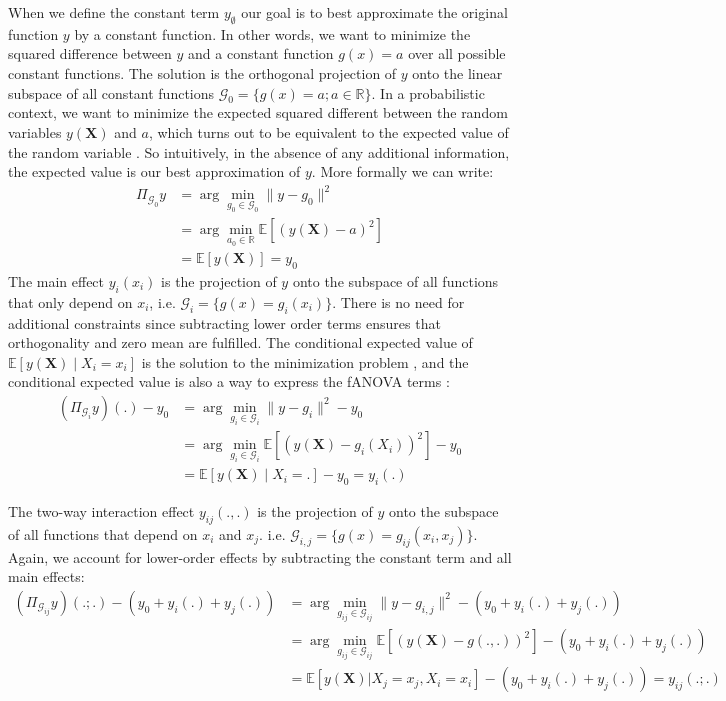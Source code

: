 When we define the constant term $y_\emptyset$ our goal is to best approximate the original function $y$ by a constant function. In other words, we want to minimize the squared difference between $y$ and a constant function $g(x) = a$ over all possible constant functions. The solution is the orthogonal projection of $y$ onto the linear subspace of all constant functions $\mathcal{G}_0 = \{g(x) = a; a \in \mathbb{R}\}$. In a probabilistic context, we want to minimize the expected squared different between the random variables $y(\boldsymbol{X})$ and $a$, which turns out to be equivalent to the expected value of the random variable \citep{Vaart_1998}. So intuitively, in the absence of any additional information, the expected value is our best approximation of $y$. More formally we can write:
\begin{align*}
    \Pi_{\mathcal{G}_0}y
    &= \arg \min_{g_0 \in \mathcal{G}_0} \|y - g_0\|^2 \\ %
    &= \arg \min_{a_0 \in \mathbb{R}} \mathbb{E}[(y(\boldsymbol{X}) - a)^2] \\ %
    &= \mathbb{E}[y(\boldsymbol{X})] = y_0
\end{align*}
The main effect $y_i(x_i)$ is the projection of $y$ onto the subspace of all functions that only depend on $x_i$, i.e. $\mathcal{G}_i = \{g(x) = g_i(x_i)\}$. There is no need for additional constraints since subtracting lower order terms ensures that orthogonality and zero mean are fulfilled.
The conditional expected value of $\mathbb{E}[y(\boldsymbol{X}) \mid X_i = x_i]$ is the solution to the minimization problem \citep{Vaart_1998}, and the conditional expected value is also a way to express the fANOVA terms \citep{muehlenstaedt2012}:
\begin{align*}
    (\Pi_{\mathcal{G}_i}y)(.) - y_0
    &= \arg \min_{g_i \in \mathcal{G}_i} \|y - g_i\|^2 - y_0\\
    &= \arg \min_{g_i \in \mathcal{G}_i} \mathbb{E}[(y(\boldsymbol{X}) - g_i(X_i))^2] - y_0 \\
    &= \mathbb{E}[y(\boldsymbol{X}) \mid X_i = .] - y_0 = y_i(.)
\end{align*}

The two-way interaction effect $y_{ij}(.,.)$ is the projection of $y$ onto the subspace of all functions that depend on $x_i$ and $x_j$. i.e. $\mathcal{G}_{i,j} = \{g(x) = g_{ij}(x_i, x_j)\}$. Again, we account for lower-order effects by subtracting the constant term and all main effects:
\begin{align*}
    (\Pi_{\mathcal{G}_{ij}}y)(.;.) - (y_0 + y_i(.) + y_j(.))
    &= \arg \min_{g_{ij} \in \mathcal{G}_{ij}} \|y - g_{i, j}\|^2 - (y_0 + y_i(.) + y_j(.))\\
    &= \arg \min_{g_{ij} \in \mathcal{G}_{ij}} \mathbb{E}[(y(\boldsymbol{X}) - g(., .))^2] - (y_0 + y_i(.) + y_j(.))\\
    &= \mathbb{E}[y(\boldsymbol{X}) | X_j = x_j, X_i = x_i] - (y_0 + y_i(.) + y_j(.)) = y_{ij}(.;.)
\end{align*}

